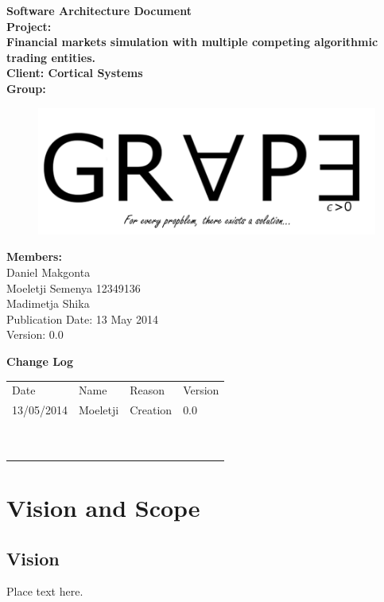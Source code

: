 \documentclass[12pt]{article}
\newcommand{\Title}{Software Architecture Document} %
\begin{document}
	\begin{center}%
		\LARGE \bf \Title \\[3em]
		\Large {Project:}\\
		Financial markets simulation with multiple competing algorithmic trading entities.\\[0.7em]
		\Large {Client:}
		Cortical Systems\\[2em]
		\LARGE {\bf Group:}\\
			\begin{figure}[ht!]
				\centering
				\includegraphics[scale=0.4]{Logo8.png}
			\end{figure}
			
		\Large {\bf Members:}\\[0.3em]
		\large
		Daniel Makgonta \\
		Moeletji Semenya 12349136\\
		Madimetja Shika \\[3em]
	
	\small Publication Date: 13 May 2014\\[0.5em]
	\small Version: 0.0 		    
	\end{center}%
	
	\newpage		
	\LARGE 
 	{\bf Change Log}\\[1em]
	\begin{tabular}{llll}
		Date & Name & Reason & Version \\
		13/05/2014 & Moeletji & Creation & 0.0 \\
		~ & ~ & ~ & ~ \\
		~ & ~ & ~ & ~ \\
	\end{tabular}
	

	
	\newpage
	\tableofcontents
				  
	\newpage
	\section{Vision and Scope}
		\subsection{Vision}
		Place text here.
		
\end{document}
